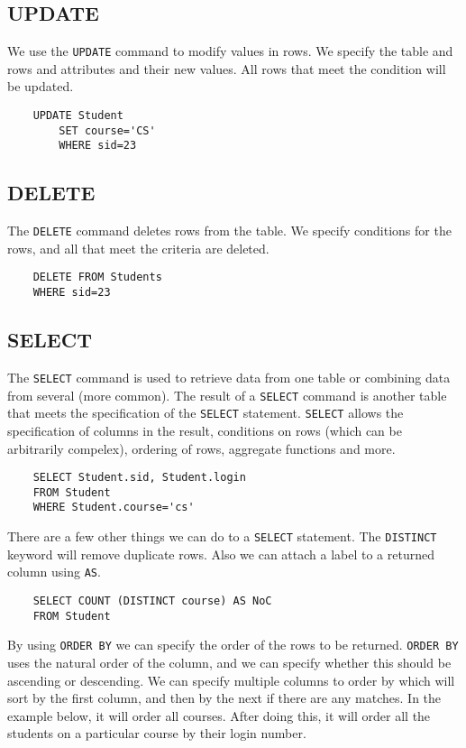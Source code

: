 \documentclass{article}
\begin{document}
	\subsection{UPDATE}
	We use the \texttt{UPDATE} command to modify values in rows. We specify the table and rows and attributes and their new values. All rows that meet the condition will be updated. 
	
	\begin{verbatim}
	UPDATE Student
	    SET course='CS'
	    WHERE sid=23
	\end{verbatim}
	
	\subsection{DELETE}
	The \texttt{DELETE} command deletes rows from the table. We specify conditions for the rows, and all that meet the criteria are deleted.
	
	\begin{verbatim}
	DELETE FROM Students
	WHERE sid=23
	\end{verbatim}
	
	\subsection{SELECT}
	The \texttt{SELECT} command is used to retrieve data from one table or combining data from several (more common). The result of a \texttt{SELECT} command is another table that meets the specification of the \texttt{SELECT} statement. \texttt{SELECT} allows the specification of columns in the result, conditions on rows (which can be arbitrarily compelex), ordering of rows, aggregate functions and more. 
	
	\begin{verbatim}
	SELECT Student.sid, Student.login
	FROM Student
	WHERE Student.course='cs'
	\end{verbatim}
	
	There are a few other things we can do to a \texttt{SELECT} statement. The \texttt{DISTINCT} keyword will remove duplicate rows. Also we can attach a label to a returned column using \texttt{AS}.
	
	\begin{verbatim}
	SELECT COUNT (DISTINCT course) AS NoC
	FROM Student
	\end{verbatim}		
	
	By using \texttt{ORDER BY} we can specify the order of the rows to be returned. \texttt{ORDER BY} uses the natural order of the column, and we can specify whether this should be ascending or descending. We can specify multiple columns to order by which will sort by the first column, and then by the next if there are any matches. In the example below, it will order all courses. After doing this, it will order all the students on a particular course by their login number.
	
\end{document}
